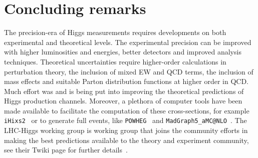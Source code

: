 \section{Concluding remarks \label{sec:singlehiggsconc}  }
The precision-era of Higgs measurements requires developments on both experimental and theoretical levels. The experimental precision can be improved with higher luminosities and energies, better detectors and improved analysis techniques. Theoretical uncertainties require higher-order calculations in perturbation theory, the inclusion of mixed EW and QCD terms, the inclusion of mass effects and suitable Parton distribution functions at higher order in QCD.  Much effort was and is being put into improving the theoretical predictions of Higgs production channels. Moreover, a plethora of computer tools have been made available to facilitate the computation of these cross-sections, for example  \texttt{iHixs2}~\cite{Dulat:2018rbf} or to generate full events, like \texttt{POWHEG}~\cite{Alioli:2008tz,Nason:2009ai,Bagnaschi:2011tu,Campbell:2012am,Luisoni:2013cuh,Jager:2014vna,Hartanto:2015uka} and \texttt{MadGraph5\_aMC@NLO}~\cite{Alwall:2014hca}. The LHC-Higgs working group is working group that joins the community efforts in making the best predictions available to the theory and experiment community, see their Twiki page for further details~\cite{HXSWG}. 


